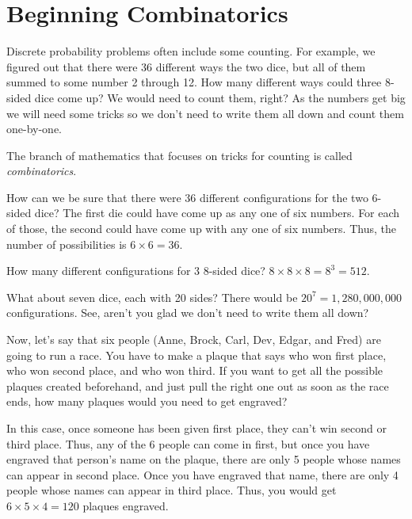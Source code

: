\chapter{Beginning Combinatorics}

Discrete probability problems often include some counting. For
example, we figured out that there were 36 different ways the two dice, 
but all of them summed to some number 2 through 12. How
many different ways could three 8-sided dice come up? We would need to
count them, right? As the numbers get big we will need some tricks so
we don't need to write them all down and count them one-by-one.

The branch of mathematics that focuses on tricks for counting is
called \textit{combinatorics}.

How can we be sure that there were 36 different configurations for the
two 6-sided dice? The first die could have come up as any one of six
numbers. For each of those, the second could have come up with any one
of six numbers. Thus, the number of possibilities is $ 6 \times 6 =
36.$

How many different configurations for 3 8-sided dice?  $8 \times 8
\times 8 = 8^3 = 512$.

What about seven dice, each with 20 sides? There would be $20^7=1,280,000,000$
configurations. See, aren't you glad we don't need to write them all
down?

Now, let's say that six people (Anne, Brock, Carl, Dev, Edgar, and Fred) are
going to run a race. You have to make a plaque that says who won first
place, who won second place, and who won third. If you want to get all
the possible plaques created beforehand, and just pull the right one
out as soon as the race ends, how many plaques would you need to get
engraved?


In this case, once someone has been given first place, they can't win
second or third place. Thus, any of the 6 people can come in first,
but once you have engraved that person's name on the plaque, there are
only 5 people whose names can appear in second place. Once you have
engraved that name, there are only 4 people whose names can appear in
third place. Thus, you would get $6 \times 5 \times 4 = 120$ plaques
engraved.

